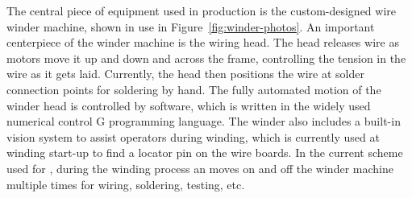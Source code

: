 \begin{comment}
A subset of procedures describing how to perform the step-by-step assembly of an \dword{apa} was originally created prior to the finalization of the \dword{pdsp} \dword{apa} series of drawings, and assigned drawing numbers. During subsequent assemblies, these instructions have evolved due to the addition of better tooling, fixtures, jigs and more complete drawing documents.  The process steps contained in each procedure have also been changed to create a better match with the B.O.M. (Bill Of Materials) contained on each finalized drawing level.  Table~\ref{tab:assembly-docs} lists what documents are available related to each assembly level.  Currently these documents are being revised to reflect the latest evolution of these procedures that were used to assemble US-\dword{apa}-4 for \dword{pdsp}.

\begin{dunetable}[\dword{apa} assembly documents]{lcc}{tab:assembly-docs}{Procedure documents for \dword{apa} assembly.}   
\dword{apa} Assembly Level & \textbf{Drawing No.} & \textbf{Assembly Instructions Doc.} \\ \toprowrule
\dword{apa} Frame Assembly & 8757 004 & 8752Doc001 \\ 
                   &          & 8752Doc002 \\ \colhline
Comb Base and Mesh & 8757 003 & 8752Doc003 \\
				   &          & 8752Doc004 \\ \colhline
Four Wire Layers   & 8757 002 & ~~~~~8752Doc005 (X) \\
                   &          & ~~~~~8752Doc006 (V) \\
                   &          & ~~~~~8752Doc007 (U) \\
                   &          & ~~~~~8752Doc008 (G) \\ \colhline
Factory \dword{apa}        & 8757 030 & 8752Doc009 \\
                   &          & 8752Doc010 \\ \colhline
Crating for Shipment & being finalized & being finalized \\
\end{dunetable}
\end{comment}

The central piece of equipment used in  production is the custom-designed wire winder machine, shown in use in Figure~\ref{fig:winder-photos}.  An important centerpiece of the winder machine is the wiring head.  The head releases wire as motors move it up and down and across the frame, controlling the tension in the wire as it gets laid. Currently, the head then positions the wire at solder connection points for soldering by hand. The fully automated motion of the winder head is controlled by software, which is written in the widely used numerical control G programming language.  The winder also includes a built-in vision system to assist operators during winding, which is currently used at winding start-up to find a locator pin on the wire boards.  In the current scheme used for , during the winding process an  moves on and off the winder machine multiple times for wiring, soldering, testing, etc.  

